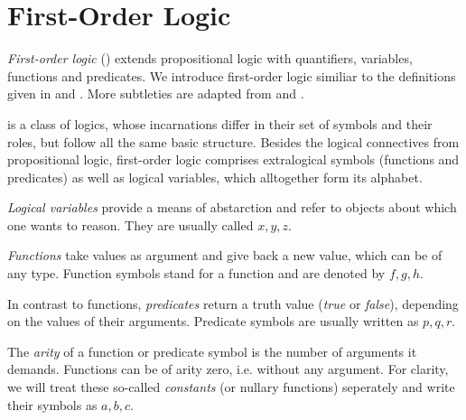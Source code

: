 



    \section{First-Order Logic}
        \label{sec:first-order-logic}

        \emph{First-order logic} (\FOL) extends propositional logic with quantifiers, variables, functions and predicates.
        We introduce first-order logic similiar to the definitions given in \cite{Platzer10HybridSystems} and \cite{Huth04LogicInCS}. More subtleties are adapted from \cite{Hodges01ClassicalLogic} and \cite{Rautenberg10ConciseLogic}.

        \FOL is a class of logics, whose incarnations differ in their set of symbols and their roles, but follow all the same basic structure.
        Besides the logical connectives from propositional logic, first-order logic comprises extralogical symbols (functions and predicates) as well as logical variables, which alltogether form its alphabet.

        \emph{Logical variables} provide a means of abstarction and refer to objects about which one wants to reason. They are usually called $x,y,z$. 

        \emph{Functions} take values as argument and give back a new value, which can be of any type. Function symbols stand for a function and are denoted by $f,g,h$.

        In contrast to functions, \emph{predicates} return a truth value (\emph{true} or \emph{false}), depending on the values of their arguments.
        Predicate symbols are usually written as $p,q,r$.

        The \emph{arity} of a function or predicate symbol is the number of arguments it demands.
        Functions can be of arity zero, i.e. without any argument.
        For clarity, we will treat these so-called \emph{constants} (or nullary functions) seperately and write their symbols as $a,b,c$.


